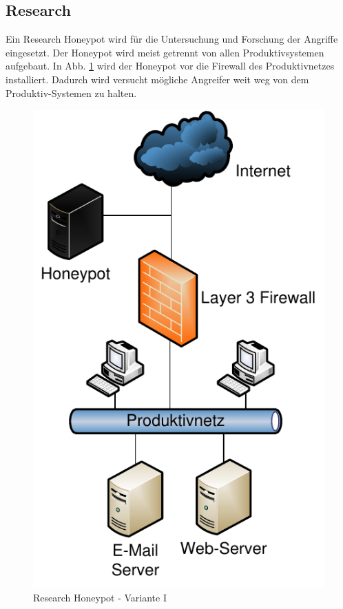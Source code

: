 \subsection{Research}

Ein Research Honeypot wird für die Untersuchung und Forschung der Angriffe eingesetzt. Der Honeypot wird meist getrennt von allen Produktivsystemen aufgebaut. In Abb. \ref{hnet:reHon1} wird der Honeypot vor die Firewall des Produktivnetzes installiert. Dadurch wird versucht mögliche Angreifer weit weg von dem Produktiv-Systemen zu halten. 
\\
\begin{figure}[ht]
    \centering\includegraphics[scale=0.6]{Bilder/Research_1.pdf}
  \caption{Research Honeypot - Variante I}
  \label{hnet:reHon1}
\end{figure}


